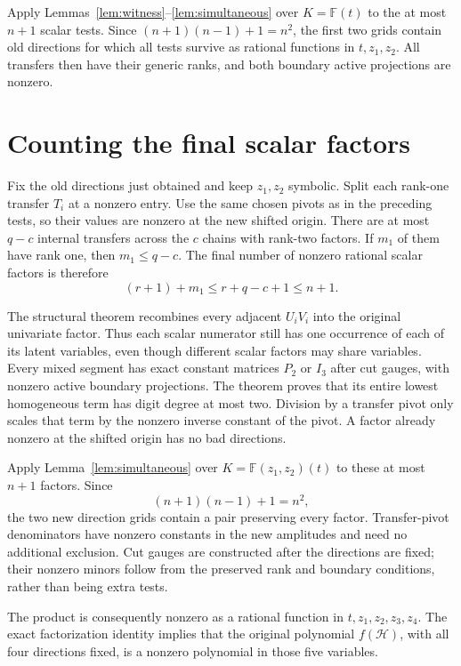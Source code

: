\documentclass[11pt]{article}
\newcommand{\F}{\mathbb F}
\begin{document}
Apply Lemmas~\ref{lem:witness}--\ref{lem:simultaneous} over \(K=\F(t)\)
to the at most \(n+1\) scalar tests.
Since \((n+1)(n-1)+1=n^2\), the first two grids contain old directions for
which all tests survive as rational functions in \(t,z_1,z_2\).
All transfers then have their generic ranks, and both boundary
active projections are nonzero.

\section{Counting the final scalar factors}

Fix the old directions just obtained and keep \(z_1,z_2\) symbolic.
Split each rank-one transfer \(T_i\) at a nonzero entry.
Use the same chosen pivots as in the preceding tests, so their values
are nonzero at the new shifted origin.
There are at most \(q-c\) internal transfers across the \(c\)
chains with rank-two factors. If \(m_1\) of them have rank one,
then \(m_1\le q-c\).
The final number of nonzero rational scalar factors is therefore
\begin{equation}\label{eq:factorcount}
 (r+1)+m_1\le r+q-c+1\le n+1.
\end{equation}

The structural theorem recombines every adjacent \(U_iV_i\) into
the original univariate factor. Thus each scalar numerator still
has one occurrence of each of its latent variables, even though
different scalar factors may share variables.
Every mixed segment has exact constant matrices \(P_2\) or \(I_3\)
after cut gauges, with nonzero active boundary projections.
The theorem proves that its entire lowest homogeneous term has
digit degree at most two. Division by a transfer pivot only scales
that term by the nonzero inverse constant of the pivot.
A factor already nonzero at the shifted origin has no bad directions.

Apply Lemma~\ref{lem:simultaneous} over
\(K=\F(z_1,z_2)(t)\) to these at most \(n+1\) factors.
Since
\[
 (n+1)(n-1)+1=n^2,
\]
the two new direction grids contain a pair preserving every factor.
Transfer-pivot denominators have nonzero constants in the new
amplitudes and need no additional exclusion. Cut gauges are
constructed after the directions are fixed; their nonzero minors
follow from the preserved rank and boundary conditions, rather than
being extra tests.

The product is consequently nonzero as a rational function in
\(t,z_1,z_2,z_3,z_4\). The exact factorization identity implies that
the original polynomial \(f(\mathcal H)\), with all four directions
fixed, is a nonzero polynomial in those five variables.
\end{document}

